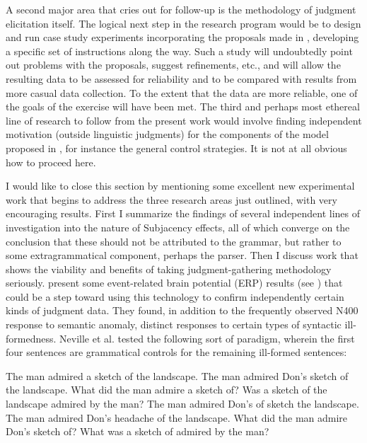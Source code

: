  A second  major area that cries out for follow-up is the methodology of judgment elicitation itself. The logical next step in the research program would be to design and run case study experiments incorporating the proposals made in , developing a specific set of instructions along the way. Such a study will undoubtedly point out problems with the proposals, suggest refinements, etc., and will allow the resulting data to be assessed for reliability and to be compared with results from more casual data collection. To the extent that the data are more reliable, one of the goals of the exercise will have been met. The third and perhaps most ethereal line of research to follow from the present work would involve finding independent motivation  (outside linguistic judgments) for the components of the model proposed in , for instance the general control strategies. It is not at all obvious how to proceed here.



 I would like to close this section by mentioning some excellent new experimental work that begins to address the three research areas just outlined, with very encouraging results. First I summarize the findings of several independent lines of investigation into the nature of Subjacency effects, all of which converge on the conclusion that these should not be attributed to the grammar, but rather to some extragrammatical component, perhaps the parser. Then I discuss work that shows the viability and benefits of taking judgment-gathering methodology seriously. \citet{NevilleEtAl1991} present some event-related brain potential (ERP) results (see ) that could be a step toward using this technology to confirm independently certain kinds of judgment data. They found, in addition to the frequently observed N400 response to semantic anomaly, distinct responses to certain types of syntactic ill-formedness. Neville et al. tested the following sort of paradigm, wherein the first four sentences are grammatical controls for the remaining ill-formed sentences:

 \ea\label{ex:6:1}
 \ea
 The man admired a sketch of the landscape.
 \ex
 The man admired Don's sketch of the landscape.
 \ex
 What did the man admire a sketch of?
 \ex
 Was a sketch of the landscape admired by the man? 
 \ex
 The man admired Don's of sketch the landscape.
 \ex
 The man admired Don's headache of the landscape.
 \ex
 What did the man admire Don's sketch of?
 \ex
 What was a sketch of admired by the man?
 \z
 \z

